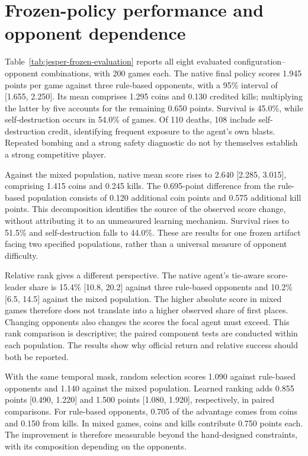 \section{Frozen-policy performance and opponent dependence}
\label{sec:jesper-results}
Table~\ref{tab:jesper-frozen-evaluation} reports all eight evaluated
configuration--opponent combinations, with 200 games each. The native
final policy scores 1.945 points per game against three rule-based
opponents, with a 95\% interval of [1.655, 2.250]. Its mean comprises
1.295 coins and 0.130 credited kills; multiplying the latter by five
accounts for the remaining 0.650 points. Survival is 45.0\%, while
self-destruction occurs in 54.0\% of games. Of 110 deaths, 108 include
self-destruction credit, identifying frequent exposure to the agent's own blasts.
Repeated bombing and a strong safety diagnostic do
not by themselves establish a strong competitive player.

Against the mixed population, native mean score rises to 2.640
[2.285, 3.015], comprising 1.415 coins and 0.245 kills. The 0.695-point
difference from the rule-based population consists of 0.120 additional
coin points and 0.575 additional kill points. This decomposition identifies
the source of the observed score change, without attributing it to an
unmeasured learning mechanism. Survival rises to 51.5\% and self-destruction
falls to 44.0\%. These are results for one frozen artifact facing two
specified populations, rather than a universal measure of opponent
difficulty.

Relative rank gives a different perspective. The native agent's tie-aware
score-leader share is 15.4\% [10.8, 20.2] against three rule-based opponents
and 10.2\% [6.5, 14.5] against the mixed population. The higher absolute
score in mixed games therefore does not translate into a higher observed
share of first places. Changing opponents also changes the scores the
focal agent must exceed. This rank comparison is descriptive; the paired
component tests are conducted within each population. The results show why
official return and relative success should both be reported.



With the same temporal mask, random selection scores 1.090 against
rule-based opponents and 1.140 against the mixed population. Learned
ranking adds 0.855 points [0.490, 1.220] and 1.500 points [1.080, 1.920],
respectively, in paired comparisons. For rule-based opponents, 0.705
of the advantage comes from coins and 0.150 from kills. In mixed games,
coins and kills contribute 0.750 points each. The improvement is therefore
measurable beyond the hand-designed constraints, with its composition
depending on the opponents.

